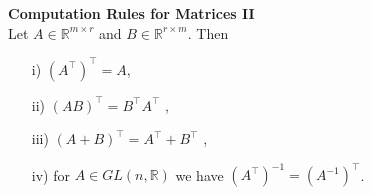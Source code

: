 {
\textbf{Computation Rules for Matrices II}\\
Let $A\in\mathbb{R}^{m\times r}$ and $B\in\mathbb{R}^{r\times m}$. Then
\begin{itemize}
    \item[i)] $(A^\top)^\top =A$,
    \item[ii)] $(AB)^\top=B^\top A^\top$ ,
    \item[iii)] $(A+B)^\top= A^\top + B^\top$ ,
    \item[iv)] for $A\in GL(n,\mathbb{R})$ we have $(A^{\top})^{-1}=(A^{-1})^{\top}$.
\end{itemize}
}
